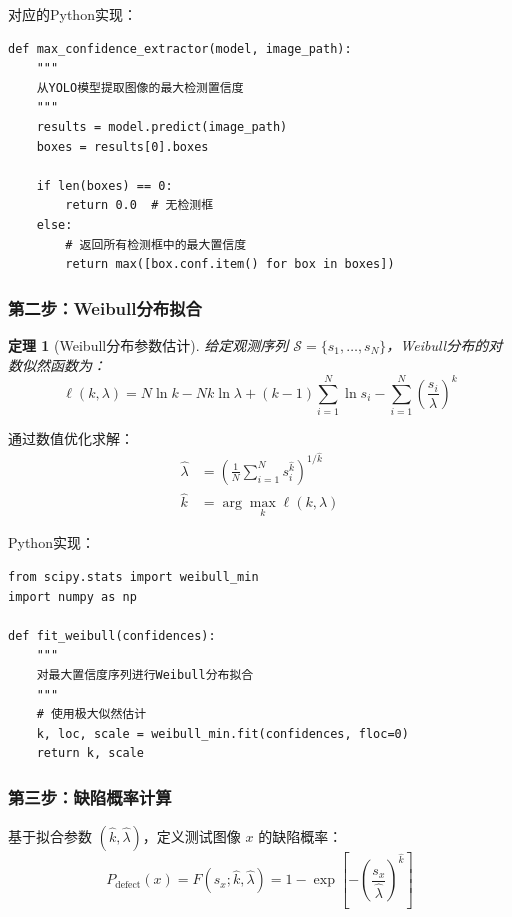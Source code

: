 \documentclass[12pt,a4paper]{ctexart}
\theoremstyle{cumcm}
\newtheorem{theorem}{定理}[section]
\begin{document}
对应的Python实现：
\begin{lstlisting}
def max_confidence_extractor(model, image_path):
    """
    从YOLO模型提取图像的最大检测置信度
    """
    results = model.predict(image_path)
    boxes = results[0].boxes

    if len(boxes) == 0:
        return 0.0  # 无检测框
    else:
        # 返回所有检测框中的最大置信度
        return max([box.conf.item() for box in boxes])
\end{lstlisting}

\subsubsection{第二步：Weibull分布拟合}

\begin{theorem}[Weibull分布参数估计]
给定观测序列 $\mathcal{S} = \{s_1, \ldots, s_N\}$，Weibull分布的对数似然函数为：
\begin{equation}
\ell(k, \lambda) = N\ln k - Nk\ln\lambda + (k-1)\sum_{i=1}^{N}\ln s_i - \sum_{i=1}^{N}\left(\frac{s_i}{\lambda}\right)^{k}
\end{equation}
\end{theorem}

通过数值优化求解：
\begin{align}
\hat{\lambda} &= \left(\frac{1}{N}\sum_{i=1}^{N}s_i^{\hat{k}}\right)^{1/\hat{k}} \\
\hat{k} &= \arg\max_k \ell(k, \lambda)
\end{align}

Python实现：
\begin{lstlisting}
from scipy.stats import weibull_min
import numpy as np

def fit_weibull(confidences):
    """
    对最大置信度序列进行Weibull分布拟合
    """
    # 使用极大似然估计
    k, loc, scale = weibull_min.fit(confidences, floc=0)
    return k, scale
\end{lstlisting}

\subsubsection{第三步：缺陷概率计算}

基于拟合参数 $(\hat{k}, \hat{\lambda})$，定义测试图像 $x$ 的缺陷概率：
\begin{equation}
P_{\mathrm{defect}}(x) = F(s_x; \hat{k}, \hat{\lambda}) = 1 - \exp\!\left[-\left(\frac{s_x}{\hat{\lambda}}\right)^{\hat{k}}\right]
\end{equation}
\end{document}
